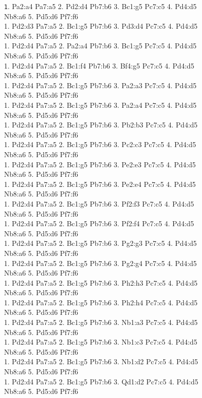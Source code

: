 \documentclass[11pt]{article}
\newenvironment{mytinylisting}
{\begin{list}{}{\setlength{\leftmargin}{1em}}\item\scriptsize\texttt}
{\end{list}}
\begin{document}
\begin{figure}
\begin{mytinylisting}
1. Pa2:a4 Pa7:a5 2. Pd2:d4 Pb7:b6 3. Bc1:g5 Pc7:c5 4. Pd4:d5 Nb8:a6 5. Pd5:d6 Pf7:f6 \\
1. Pd2:d3 Pa7:a5 2. Bc1:g5 Pb7:b6 3. Pd3:d4 Pc7:c5 4. Pd4:d5 Nb8:a6 5. Pd5:d6 Pf7:f6 \\
1. Pd2:d4 Pa7:a5 2. Pa2:a4 Pb7:b6 3. Bc1:g5 Pc7:c5 4. Pd4:d5 Nb8:a6 5. Pd5:d6 Pf7:f6 \\
1. Pd2:d4 Pa7:a5 2. Bc1:f4 Pb7:b6 3. Bf4:g5 Pc7:c5 4. Pd4:d5 Nb8:a6 5. Pd5:d6 Pf7:f6 \\
1. Pd2:d4 Pa7:a5 2. Bc1:g5 Pb7:b6 3. Pa2:a3 Pc7:c5 4. Pd4:d5 Nb8:a6 5. Pd5:d6 Pf7:f6 \\
1. Pd2:d4 Pa7:a5 2. Bc1:g5 Pb7:b6 3. Pa2:a4 Pc7:c5 4. Pd4:d5 Nb8:a6 5. Pd5:d6 Pf7:f6 \\
1. Pd2:d4 Pa7:a5 2. Bc1:g5 Pb7:b6 3. Pb2:b3 Pc7:c5 4. Pd4:d5 Nb8:a6 5. Pd5:d6 Pf7:f6 \\
1. Pd2:d4 Pa7:a5 2. Bc1:g5 Pb7:b6 3. Pc2:c3 Pc7:c5 4. Pd4:d5 Nb8:a6 5. Pd5:d6 Pf7:f6 \\
1. Pd2:d4 Pa7:a5 2. Bc1:g5 Pb7:b6 3. Pe2:e3 Pc7:c5 4. Pd4:d5 Nb8:a6 5. Pd5:d6 Pf7:f6 \\
1. Pd2:d4 Pa7:a5 2. Bc1:g5 Pb7:b6 3. Pe2:e4 Pc7:c5 4. Pd4:d5 Nb8:a6 5. Pd5:d6 Pf7:f6 \\
1. Pd2:d4 Pa7:a5 2. Bc1:g5 Pb7:b6 3. Pf2:f3 Pc7:c5 4. Pd4:d5 Nb8:a6 5. Pd5:d6 Pf7:f6 \\
1. Pd2:d4 Pa7:a5 2. Bc1:g5 Pb7:b6 3. Pf2:f4 Pc7:c5 4. Pd4:d5 Nb8:a6 5. Pd5:d6 Pf7:f6 \\
1. Pd2:d4 Pa7:a5 2. Bc1:g5 Pb7:b6 3. Pg2:g3 Pc7:c5 4. Pd4:d5 Nb8:a6 5. Pd5:d6 Pf7:f6 \\
1. Pd2:d4 Pa7:a5 2. Bc1:g5 Pb7:b6 3. Pg2:g4 Pc7:c5 4. Pd4:d5 Nb8:a6 5. Pd5:d6 Pf7:f6 \\
1. Pd2:d4 Pa7:a5 2. Bc1:g5 Pb7:b6 3. Ph2:h3 Pc7:c5 4. Pd4:d5 Nb8:a6 5. Pd5:d6 Pf7:f6 \\
1. Pd2:d4 Pa7:a5 2. Bc1:g5 Pb7:b6 3. Ph2:h4 Pc7:c5 4. Pd4:d5 Nb8:a6 5. Pd5:d6 Pf7:f6 \\
1. Pd2:d4 Pa7:a5 2. Bc1:g5 Pb7:b6 3. Nb1:a3 Pc7:c5 4. Pd4:d5 Nb8:a6 5. Pd5:d6 Pf7:f6 \\
1. Pd2:d4 Pa7:a5 2. Bc1:g5 Pb7:b6 3. Nb1:c3 Pc7:c5 4. Pd4:d5 Nb8:a6 5. Pd5:d6 Pf7:f6 \\
1. Pd2:d4 Pa7:a5 2. Bc1:g5 Pb7:b6 3. Nb1:d2 Pc7:c5 4. Pd4:d5 Nb8:a6 5. Pd5:d6 Pf7:f6 \\
1. Pd2:d4 Pa7:a5 2. Bc1:g5 Pb7:b6 3. Qd1:d2 Pc7:c5 4. Pd4:d5 Nb8:a6 5. Pd5:d6 Pf7:f6 \\

\end{mytinylisting}
\end{figure}
\end{document}
